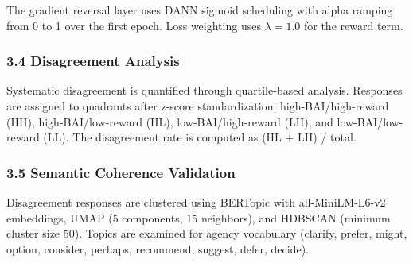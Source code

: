 The gradient reversal layer uses DANN sigmoid scheduling with alpha ramping from 0 to 1 over the first epoch. Loss weighting uses $\lambda =1.0$ for the reward term.

\subsubsection{3.4 Disagreement Analysis}

Systematic disagreement is quantified through quartile-based analysis. Responses are assigned to quadrants after z-score standardization: high-BAI/high-reward (HH), high-BAI/low-reward (HL), low-BAI/high-reward (LH), and low-BAI/low-reward (LL). The disagreement rate is computed as (HL + LH) / total.

\subsubsection{3.5 Semantic Coherence Validation}

Disagreement responses are clustered using BERTopic with all-MiniLM-L6-v2 embeddings, UMAP (5 components, 15 neighbors), and HDBSCAN (minimum cluster size 50). Topics are examined for agency vocabulary (clarify, prefer, might, option, consider, perhaps, recommend, suggest, defer, decide).
